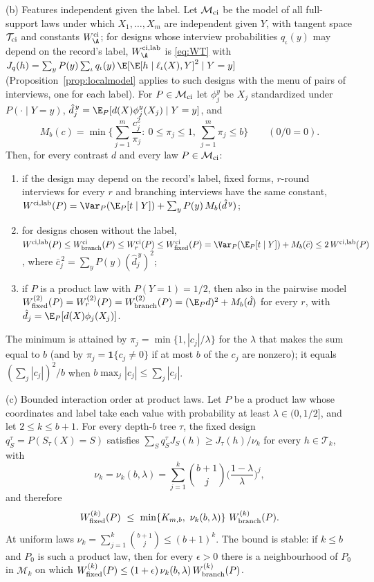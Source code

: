 \begin{theorem}
\textup{(b) Features independent given the label.} Let $\mathcal M_{\rm ci}$
be the model of all full-support laws under which $X_1,\ldots,X_m$ are
independent given $Y$, with tangent space $\mathcal T_{\rm ci}$ and constants
$W^{\rm ci}_\A$; for designs whose interview probabilities $q_\iota(y)$ may depend on the record's label, $W^{\rm ci,lab}_\A$ is \eqref{eq:WT} with $J_q(h)=\sum_yP(y)\sum_\iota q_\iota(y)\,\E[\E[h\mid\ell_\iota(X),Y]^2\mid Y=y]$ (Proposition~\ref{prop:localmodel} applies to such designs with the menu of pairs of interviews, one for each label). For $P\in\mathcal M_{\rm ci}$ let $\phi^y_j$ be $X_j$
standardized under $P(\cdot\mid Y=y)$,
$\hat d^{\,y}_j=\E_P[d(X)\phi^y_j(X_j)\mid Y=y]$, and
\[
 M_b(c)=\min\Big\{\sum_{j=1}^m\frac{c_j^2}{\pi_j}:\ 0\le\pi_j\le1,\ \sum_{j=1}^m\pi_j\le b\Big\}\qquad(0/0=0).
\]
Then, for every contrast $d$ and every law $P\in\mathcal M_{\rm ci}$:
\begin{enumerate}
\item[\textup{(i)}] if the design may depend on the record's label, fixed
forms, $r$-round interviews for every $r$ and branching interviews have the
same constant,
$W^{\rm ci,lab}(P)=\Var_P(\E_P[t\mid Y])+\sum_yP(y)\,M_b(\hat d^{\,y})$;
\item[\textup{(ii)}] for designs chosen without the label,
$W^{\rm ci,lab}(P)\le W^{\rm ci}_{\rm branch}(P)\le W^{\rm ci}_{r}(P)\le W^{\rm ci}_{\rm fixed}(P)=\Var_P(\E_P[t\mid Y])+M_b(\bar c)\le2\,W^{\rm ci,lab}(P)$,
where $\bar c_j^{\,2}=\sum_yP(y)(\hat d^{\,y}_j)^2$;
\item[\textup{(iii)}] if $P$ is a product law with $P(Y=1)=1/2$, then also in
the pairwise model
$W^{(2)}_{\rm fixed}(P)=W^{(2)}_{r}(P)=W^{(2)}_{\rm branch}(P)=(\E_Pd)^2+M_b(\hat d)$
for every $r$, with $\hat d_j=\E_P[d(X)\phi_j(X_j)]$.
\end{enumerate}
The minimum is attained by $\pi_j=\min\{1,|c_j|/\lambda\}$ for the $\lambda$
that makes the sum equal to $b$ (and by $\pi_j=\mathbf 1\{c_j\ne0\}$ if at most $b$ of the
$c_j$ are nonzero); it equals $(\sum_j|c_j|)^2/b$ when
$b\max_j|c_j|\le\sum_j|c_j|$.

\textup{(c) Bounded interaction order at product laws.} Let $P$ be a product
law whose coordinates and label take each value with probability at least
$\lambda\in(0,1/2]$, and let $2\le k\le b+1$. For every depth-$b$ tree
$\tau$, the fixed design $q^\tau_S=P(S_\tau(X)=S)$ satisfies
$\sum_Sq^\tau_SJ_S(h)\ge J_\tau(h)/\nu_k$ for every $h\in\mathcal T_k$,
with
\[
 \nu_k=\nu_k(b,\lambda)=\sum_{j=1}^{k}\binom{b+1}{j}\Big(\frac{1-\lambda}{\lambda}\Big)^{j},
\]
and therefore
\[
 W^{(k)}_{\rm fixed}(P)\ \le\ \min\{K_{m,b},\ \nu_k(b,\lambda)\}\ W^{(k)}_{\rm branch}(P).
\]
At uniform laws $\nu_k=\sum_{j=1}^k\binom{b+1}{j}\le(b+1)^k$.
The bound is stable: if $k\le b$ and $P_0$ is such a product law, then for
every $\epsilon>0$ there is a neighbourhood of $P_0$ in $\mathcal M_k$ on
which $W^{(k)}_{\rm fixed}(P)\le(1+\epsilon)\,\nu_k(b,\lambda)\,W^{(k)}_{\rm branch}(P)$.


\end{theorem}
